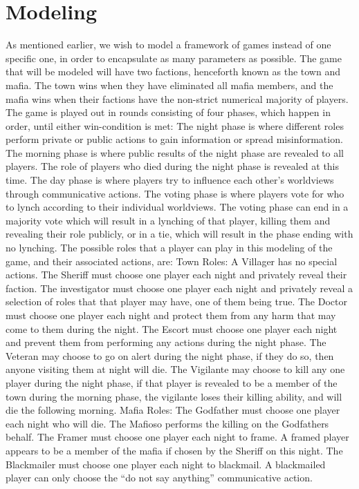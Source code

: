 \section{Modeling}
As mentioned earlier, we wish to model a framework of games instead of one
specific one, in order to encapsulate as many parameters as possible. The game
that will be modeled will have two factions, henceforth known as the town and
mafia. The town wins when they have eliminated all mafia members, and the mafia
wins when their factions have the non-strict numerical majority of players. The
game is played out in rounds consisting of four phases, which happen in order,
until either win-condition is met: The night phase is where different roles
perform private or public actions to gain information or spread misinformation.
The morning phase is where public results of the night phase are revealed to
all players. The role of players who died during the night phase is revealed at
this time. The day phase is where players try to influence each other's
worldviews through communicative actions. The voting phase is where players
vote for who to lynch according to their individual worldviews. The voting
phase can end in a majority vote which will result in a lynching of that
player, killing them and revealing their role publicly, or in a tie, which will
result in the phase ending with no lynching. The possible roles that a player
can play in this modeling of the game, and their associated actions, are: Town
Roles: A Villager has no special actions. The Sheriff must choose one player
each night and privately reveal their faction. The investigator must choose one
player each night and privately reveal a selection of roles that that player
may have, one of them being true. The Doctor must choose one player each night
and protect them from any harm that may come to them during the night. The
Escort must choose one player each night and prevent them from performing any
actions during the night phase. The Veteran may choose to go on alert during
the night phase, if they do so, then anyone visiting them at night will die.
The Vigilante may choose to kill any one player during the night phase, if that
player is revealed to be a member of the town during the morning phase, the
vigilante loses their killing ability, and will die the following morning.
Mafia Roles: The Godfather must choose one player each night who will die. The
Mafioso performs the killing on the Godfathers behalf. The Framer must choose
one player each night to frame. A framed player appears to be a member of the
mafia if chosen by the Sheriff on this night. The Blackmailer must choose one
player each night to blackmail. A blackmailed player can only choose the “do
not say anything” communicative action.

